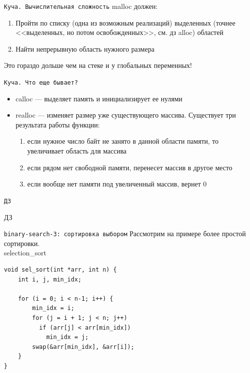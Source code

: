 \documentclass[pdf, 10pt, unicode]{beamer}
\begin{document}
\begin{frame}[fragile]{{\tt Куча. Вычислительная сложность}}
malloc должен:
\begin{enumerate}
    \item Пройти по списку (одна из возможным реализаций) выделенных (точнее <<выделенных, но потом освобожденных>>, см. дз alloc) областей
    \item Найти непрерывную область нужного размера
\end{enumerate}
Это гораздо дольше чем на стеке и у глобальных переменных!
\end{frame}

\begin{frame}[fragile]{{\tt Куча. Что еще бывает?}}
\begin{itemize}
  \item calloc --- выделяет память и инициализирует ее нулями
  \item realloc --- изменяет размер уже существующего массива. Существует три результата работы функции:
  \begin{enumerate}
    \item если нужное число байт не занято в данной области памяти, то увеличивает область для массива
    \item если рядом нет свободной памяти, перенесет массив в другое место
    \item если вообще нет памяти под увеличенный массив, вернет 0
  \end{enumerate}
\end{itemize}
\end{frame}

\begin{frame}[fragile]{{\tt ДЗ}}
\begin{center}
\begin{huge}ДЗ\end{huge}
\end{center}
\end{frame}


\begin{frame}[fragile]{{\tt binary-search-3: сортировка выбором}}
Рассмотрим на примере более простой сортировки.\\
selection\_sort
  \begin{lstlisting}
void sel_sort(int *arr, int n) {
    int i, j, min_idx;

    for (i = 0; i < n-1; i++) {
        min_idx = i;
        for (j = i + 1; j < n; j++)
          if (arr[j] < arr[min_idx])
            min_idx = j;
        swap(&arr[min_idx], &arr[i]);
    }
}

  \end{lstlisting}

\end{frame}
\end{document}
